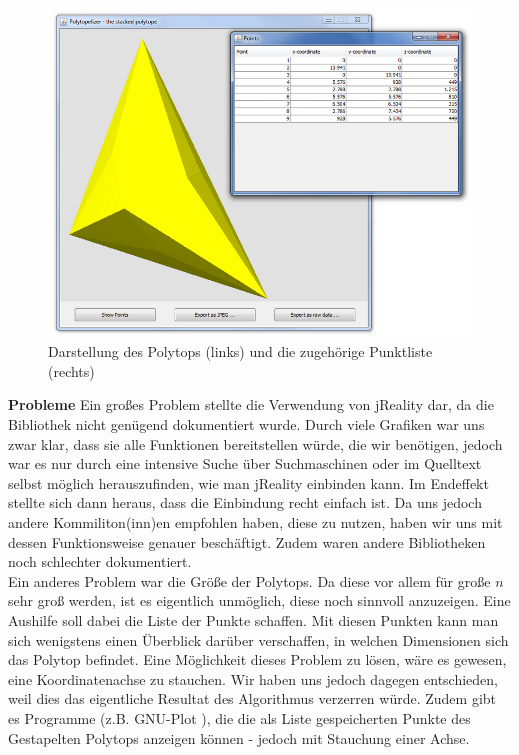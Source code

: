 \begin{figure}[htbp]
	\centering
	\includegraphics[scale=0.5]{figures/output.png}
	\caption{Darstellung des Polytops (links) und die zugehörige Punktliste (rechts)}
	\label{polytop}
\end{figure}

\textbf{Probleme} Ein großes Problem stellte die Verwendung von jReality dar, da die Bibliothek nicht genügend dokumentiert wurde. Durch viele Grafiken war uns zwar klar, dass sie alle Funktionen bereitstellen würde, die wir benötigen, jedoch war es nur durch eine intensive Suche über Suchmaschinen oder im Quelltext selbst möglich herauszufinden, wie man jReality einbinden kann. Im Endeffekt stellte sich dann heraus, dass die Einbindung recht einfach ist. Da uns jedoch andere Kommiliton(inn)en empfohlen haben, diese zu nutzen, haben wir uns mit dessen Funktionsweise genauer beschäftigt. Zudem waren andere Bibliotheken noch schlechter dokumentiert.\\
Ein anderes Problem war die Größe der Polytops. Da diese vor allem für große $n$ sehr groß werden, ist es eigentlich unmöglich, diese noch sinnvoll anzuzeigen. Eine Aushilfe soll dabei die Liste der Punkte schaffen. Mit diesen Punkten kann man sich wenigstens einen Überblick darüber verschaffen, in welchen Dimensionen sich das Polytop befindet. Eine Möglichkeit dieses Problem zu lösen, wäre es gewesen, eine Koordinatenachse zu stauchen. Wir haben uns jedoch dagegen entschieden, weil dies das eigentliche Resultat des Algorithmus verzerren würde. Zudem gibt es Programme (z.B. GNU-Plot \cite{gnuplot}), die die als Liste gespeicherten Punkte des Gestapelten Polytops anzeigen können - jedoch mit Stauchung einer Achse.

